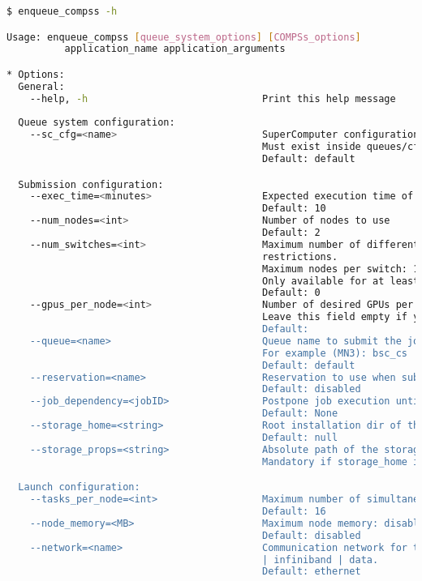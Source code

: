 \begin{lstlisting}[language=bash]
$ enqueue_compss -h

Usage: enqueue_compss [queue_system_options] [COMPSs_options] 
          application_name application_arguments

* Options:
  General:
    --help, -h                              Print this help message
  
  Queue system configuration:
    --sc_cfg=<name>                         SuperComputer configuration file to use. 
                                            Must exist inside queues/cfgs/
                                            Default: default

  Submission configuration: 
    --exec_time=<minutes>                   Expected execution time of the application (in minutes)
                                            Default: 10
    --num_nodes=<int>                       Number of nodes to use
                                            Default: 2
    --num_switches=<int>                    Maximum number of different switches. Select 0 for no 
                                            restrictions.
                                            Maximum nodes per switch: 18
                                            Only available for at least 4 nodes. 
                                            Default: 0 
    --gpus_per_node=<int>                   Number of desired GPUs per node.
                                            Leave this field empty if your application doesn't use GPUs.
                                            Default: 
    --queue=<name>                          Queue name to submit the job. Depends on the queue system.
                                            For example (MN3): bsc_cs | bsc_debug | debug | interactive
                                            Default: default
    --reservation=<name>                    Reservation to use when submitting the job. 
                                            Default: disabled
    --job_dependency=<jobID>                Postpone job execution until the job dependency has ended.
                                            Default: None
    --storage_home=<string>                 Root installation dir of the storage implementation
                                            Default: null
    --storage_props=<string>                Absolute path of the storage properties file
                                            Mandatory if storage_home is defined

  Launch configuration:
    --tasks_per_node=<int>                  Maximum number of simultaneous tasks running on a node
                                            Default: 16
    --node_memory=<MB>                      Maximum node memory: disabled | <int> (MB)
                                            Default: disabled
    --network=<name>                        Communication network for transfers: default | ethernet 
                                            | infiniband | data.
                                            Default: ethernet
                                              

\end{lstlisting}
